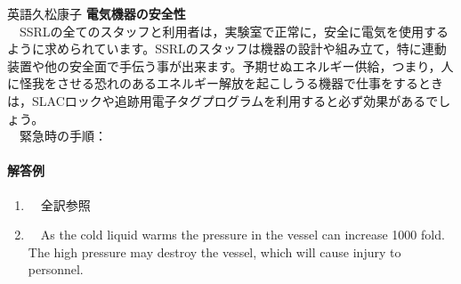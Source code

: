 \documentclass[fleqn]{jbook}
\begin{document}
\begin{answer}{英語}{久松康子}
{\bf 電気機器の安全性}\\
　SSRLの全てのスタッフと利用者は，実験室で正常に，安全に電気を使用するように求められています。SSRLのスタッフは機器の設計や組み立て，特に連動装置や他の安全面で手伝う事が出来ます。予期せぬエネルギー供給，つまり，人に怪我をさせる恐れのあるエネルギー解放を起こしうる機器で仕事をするときは，SLACロックや追跡用電子タグプログラムを利用すると必ず効果があるでしょう。\\

　緊急時の手順：


\paragraph{解答例}

\begin{enumerate}

\item 　全訳参照

\item 　As the cold liquid warms the pressure in the vessel can 
increase 1000 fold.  The high pressure may destroy the vessel, 
which will cause injury to personnel.

\end{enumerate}

\end{answer}
\end{document}
